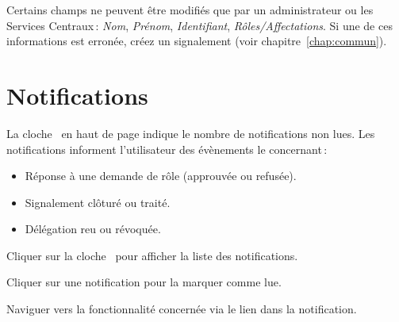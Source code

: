 \begin{warnbox}
  Certains champs ne peuvent \^etre modifi\'es que par un administrateur ou les Services Centraux\,: \textit{Nom}, \textit{Pr\'enom}, \textit{Identifiant}, \textit{R\^oles/Affectations}. Si une de ces informations est erron\'ee, cr\'eez un signalement (voir chapitre~\ref{chap:commun}).
\end{warnbox}

\section{Notifications}

La cloche \faBell\ en haut de page indique le nombre de notifications non lues. Les notifications informent l'utilisateur des \'ev\`enements le concernant\,:

\begin{itemize}
  \item R\'eponse \`a une demande de r\^ole (approuv\'ee ou refus\'ee).
  \item Signalement cl\^otur\'e ou trait\'e.
  \item D\'el\'egation reu ou r\'evoqu\'ee.
\end{itemize}

\begin{steps}
  \item Cliquer sur la cloche \faBell\ pour afficher la liste des notifications.
  \item Cliquer sur une notification pour la marquer comme lue.
  \item Naviguer vers la fonctionnalit\'e concern\'ee via le lien dans la notification.
\end{steps}

